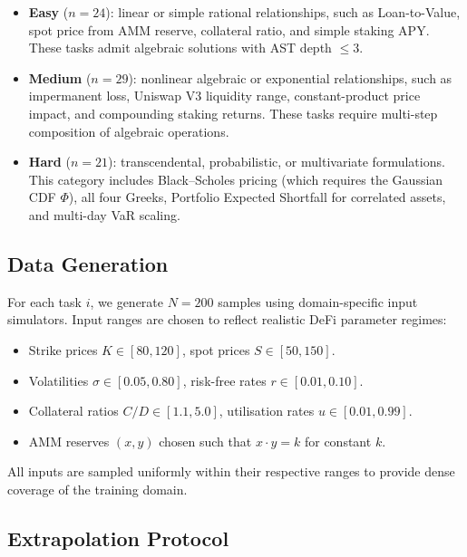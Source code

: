 \documentclass[twoside,11pt]{article}
\begin{document}
\begin{itemize}
  \item \textbf{Easy} ($n=24$): linear or simple rational relationships, such as
    Loan-to-Value, spot price from AMM reserve, collateral ratio, and simple staking APY.
    These tasks admit algebraic solutions with AST depth $\le 3$.

  \item \textbf{Medium} ($n=29$): nonlinear algebraic or exponential relationships,
    such as impermanent loss, Uniswap V3 liquidity range, constant-product price impact,
    and compounding staking returns.  These tasks require multi-step composition
    of algebraic operations.

  \item \textbf{Hard} ($n=21$): transcendental, probabilistic, or multivariate
    formulations.  This category includes Black--Scholes pricing (which requires
    the Gaussian CDF $\Phi$), all four Greeks, Portfolio Expected Shortfall for
    correlated assets, and multi-day VaR scaling. 
\end{itemize}


\subsection{Data Generation}\label{subsec:data-generation}
\label{sec:bench_datagen}

For each task $i$, we generate $N=200$ samples using domain-specific input
simulators.  Input ranges are chosen to reflect realistic DeFi parameter regimes:
\begin{itemize}
  \item Strike prices $K \in [80, 120]$, spot prices $S \in [50, 150]$.
  \item Volatilities $\sigma \in [0.05, 0.80]$, risk-free rates $r \in [0.01, 0.10]$.
  \item Collateral ratios $C/D \in [1.1, 5.0]$, utilisation rates $u \in [0.01, 0.99]$.
  \item AMM reserves $(x, y)$ chosen such that $x \cdot y = k$ for constant $k$.
\end{itemize}
All inputs are sampled uniformly within their respective ranges to provide dense
coverage of the training domain.

\subsection{Extrapolation Protocol}\label{subsec:extrapolation-protocol}
\label{sec:split}
\end{document}
